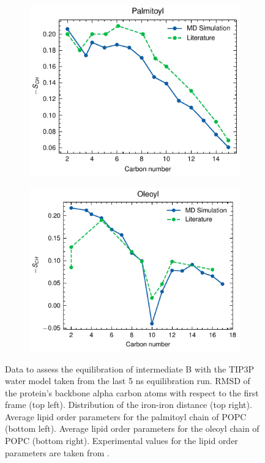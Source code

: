 \begin{figure}[htbp]
\begin{subfigure}{.49\textwidth}
        \includegraphics[width=\textwidth]{Figures/TIP3P_palmitoyl.pdf}
    \end{subfigure}
    \begin{subfigure}{.49\textwidth}
        \centering
        \includegraphics[width=\textwidth]{Figures/TIP3P_oleoyl.pdf}
    \end{subfigure}
    \caption{Data to assess the equilibration of intermediate B with the TIP3P water model taken from the last 5 ns equilibration run. RMSD of the protein's backbone alpha carbon atoms with respect to the first frame (top left). Distribution of the iron-iron distance (top right). Average lipid order parameters for the palmitoyl chain of POPC (bottom left). Average lipid order parameters for the oleoyl chain of POPC (bottom right). Experimental values for the lipid order parameters are taken from \cite{Seelig1978,Perly1985}.}
    \label{fig:TIP3P_equilibration}
\end{figure}

